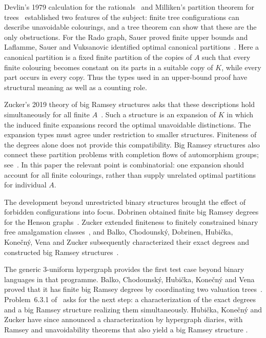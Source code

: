 \documentclass{article}
\numberwithin{equation}{section}
\theoremstyle{definition}
\begin{document}
Devlin's 1979 calculation for the rationals~\cite{Devlin} and Milliken's
partition theorem for trees~\cite{Milliken} established two features of
the subject: finite tree configurations can describe unavoidable
colourings, and a tree theorem can show that these are the only
obstructions. For the Rado graph, Sauer proved finite upper bounds and
Laflamme, Sauer and Vuksanovic identified optimal canonical
partitions~\cite{Sauer,LSV}. Here a canonical partition is a fixed finite
partition of the copies of $A$ such that every finite colouring becomes
constant on its parts in a suitable copy of $K$, while every part occurs
in every copy. Thus the types used in an upper-bound proof have
structural meaning as well as a counting role.

Zucker's 2019 theory of big Ramsey structures asks that these descriptions
hold simultaneously for all finite $A$~\cite{ZuckerDynamics}. Such a
structure is an expansion of $K$ in which the induced finite expansions
record the optimal unavoidable distinctions. The expansion types must
agree under restriction to smaller structures. Finiteness of the degrees
alone does not provide this compatibility. Big Ramsey structures also
connect these partition problems with completion flows of automorphism
groups; see~\cite{ZuckerDynamics,HZ}. In this paper the relevant point is
combinatorial: one expansion should account for all finite colourings,
rather than supply unrelated optimal partitions for individual $A$.

The development beyond unrestricted binary structures brought the
effect of forbidden configurations into focus. Dobrinen obtained finite
big Ramsey degrees for the Henson graphs~\cite{DobrinenTriangleFree,DobrinenHenson}.
Zucker extended finiteness to finitely constrained binary free
amalgamation classes~\cite{ZuckerBinary}, and Balko, Chodounsk\'y,
Dobrinen, Hubi\v cka, Kone\v cn\'y, Vena and Zucker subsequently
characterized their exact degrees and constructed big Ramsey
structures~\cite{BinaryExact}.

The generic $3$-uniform hypergraph provides the first test case beyond
binary languages in that programme. Balko, Chodounsk\'y, Hubi\v cka,
Kone\v cn\'y and Vena proved that it has finite big Ramsey degrees by
coordinating two valuation trees~\cite{TernaryFinite}. Problem~6.3.1
of~\cite[p.~2144]{BinaryExact} asks for the next step: a characterization
of the exact degrees and a big Ramsey structure realizing them
simultaneously. Hubi\v cka, Kone\v cn\'y and Zucker have since announced
a characterization by hypergraph diaries, with Ramsey and unavoidability
theorems that also yield a big Ramsey structure
\cite[Theorems~1.4, 3.2 and~3.3]{TernaryDiaries}.
\end{document}
